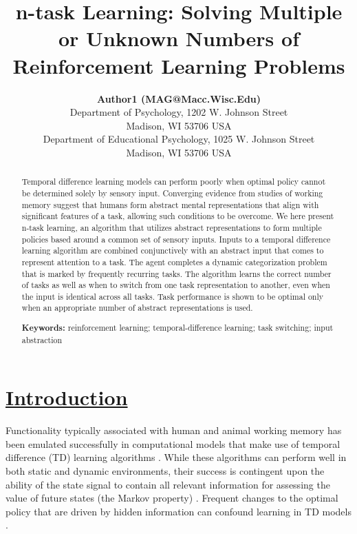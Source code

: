 \documentclass[10pt,letterpaper]{article}
\title{n-task Learning: Solving Multiple or Unknown Numbers of Reinforcement Learning Problems}
\author{{\large \bf Author1 (MAG@Macc.Wisc.Edu)} \\
  Department of Psychology, 1202 W. Johnson Street \\
  Madison, WI 53706 USA
  \AND {\large \bf Author2 (SDJ@Macc.Wisc.Edu)} \\
  Department of Educational Psychology, 1025 W. Johnson Street \\
  Madison, WI 53706 USA}
\begin{document}
\maketitle

\begin{abstract}
Temporal difference learning models can perform poorly when optimal policy cannot be determined solely by sensory input. Converging evidence from studies of working memory suggest that humans form abstract mental representations that align with significant features of a task, allowing such conditions to be overcome. We here present n-task learning, an algorithm that utilizes abstract representations to form multiple policies based around a common set of sensory inputs. Inputs to a temporal difference learning algorithm are combined conjunctively with an abstract input that comes to represent attention to a task. The agent completes a dynamic categorization problem that is marked by frequently recurring tasks. The algorithm learns the correct number of tasks as well as when to switch from one task representation to another, even when the input is identical across all tasks. Task performance is shown to be optimal only when an appropriate number of abstract representations is used.

\textbf{Keywords:} 
reinforcement learning; temporal-difference learning; task switching; input abstraction

\end{abstract}

\section{\underline{Introduction}}

Functionality typically associated with human and animal working memory has been emulated successfully in computational models that make use of temporal difference (TD) learning algorithms \cite{oreilly_prefrontal_2002,oreilly_making_2006,oreilly_biologically_2006,frank_interactions_2001,kriete_generalisation_2011,kriete_indirection_2013,niv_reinforcement_2015,rougier_prefrontal_2005,phillips_biologically_2005,phillips_working_2006}. While these algorithms can perform well in both static and dynamic environments, their success is contingent upon the ability of the state signal to contain all relevant information for assessing the value of future states (the Markov property) \cite{sutton_reinforcement_1998}. Frequent changes to the optimal policy that are driven by hidden information can confound learning in TD models \cite{brunskill_online_2015}.
\end{document}

